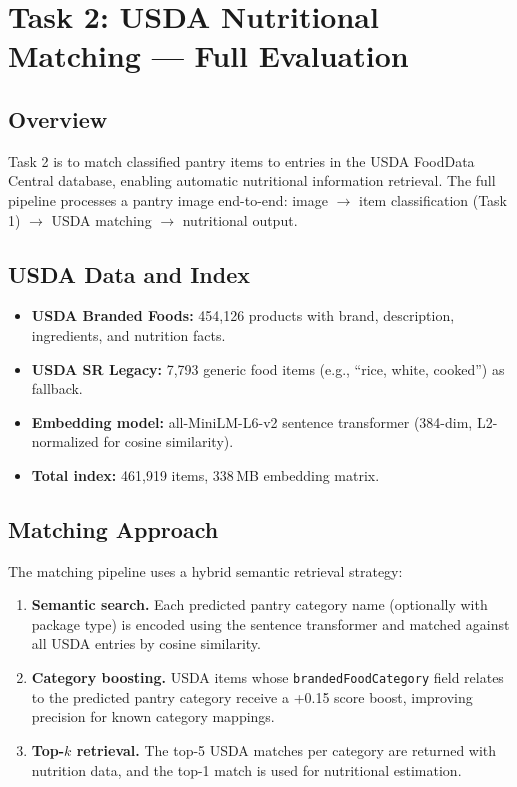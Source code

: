 \section{Task 2: USDA Nutritional Matching --- Full Evaluation}
\label{sec:task2}

\subsection{Overview}

Task 2 is to match classified pantry items to entries in the USDA FoodData Central database, enabling automatic nutritional information retrieval. The full pipeline processes a pantry image end-to-end: image $\rightarrow$ item classification (Task 1) $\rightarrow$ USDA matching $\rightarrow$ nutritional output.

\subsection{USDA Data and Index}

\begin{itemize}[nosep,leftmargin=1.5em]
  \item \textbf{USDA Branded Foods:} 454,126 products with brand, description, ingredients, and nutrition facts.
  \item \textbf{USDA SR Legacy:} 7,793 generic food items (e.g., ``rice, white, cooked'') as fallback.
  \item \textbf{Embedding model:} all-MiniLM-L6-v2 sentence transformer (384-dim, L2-normalized for cosine similarity).
  \item \textbf{Total index:} 461,919 items, 338\,MB embedding matrix.
\end{itemize}

\subsection{Matching Approach}

The matching pipeline uses a hybrid semantic retrieval strategy:

\begin{enumerate}[nosep,leftmargin=1.5em]
  \item \textbf{Semantic search.} Each predicted pantry category name (optionally with package type) is encoded using the sentence transformer and matched against all USDA entries by cosine similarity.
  \item \textbf{Category boosting.} USDA items whose \texttt{brandedFoodCategory} field relates to the predicted pantry category receive a +0.15 score boost, improving precision for known category mappings.
  \item \textbf{Top-$k$ retrieval.} The top-5 USDA matches per category are returned with nutrition data, and the top-1 match is used for nutritional estimation.
\end{enumerate}

